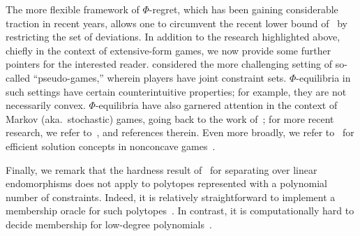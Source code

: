The more flexible framework of $\Phi$-regret, which has been gaining considerable traction in recent years, allows one to circumvent the recent lower bound of~\citet{Daskalakis24:Lower} by restricting the set of deviations. In addition to the research highlighted above, chiefly in the context of extensive-form games, we now provide some further pointers for the interested reader. \citet{Bernasconi23:Constrained} considered the more challenging setting of so-called ``pseudo-games,'' wherein players have joint constraint sets. $\Phi$-equilibria in such settings have certain counterintuitive properties; for example, they are not necessarily convex. $\Phi$-equilibria have also garnered attention in the context of Markov (aka.\ stochastic) games, going back to the work of~\citet{Greenwald03:Correlated}; for more recent research, we refer to~\citet{Jin24:Vlearning,Erez23:Regret,Cai24:Near}, and references therein. Even more broadly, we refer to~\citet{Cai24:Tractable,Ahunbay25:First} for efficient solution concepts in nonconcave games~\citep{Daskalakis22:Non}.

Finally, we remark that the hardness result of~\citet{Daskalakis24:Efficient} for separating over linear endomorphisms does not apply to polytopes represented with a polynomial number of constraints. Indeed, it is relatively straightforward to implement a membership oracle for such polytopes~\citep{Daskalakis24:Efficient}. In contrast, it is computationally hard to decide membership for low-degree polynomials~\citep{Zhang24:Efficient}.